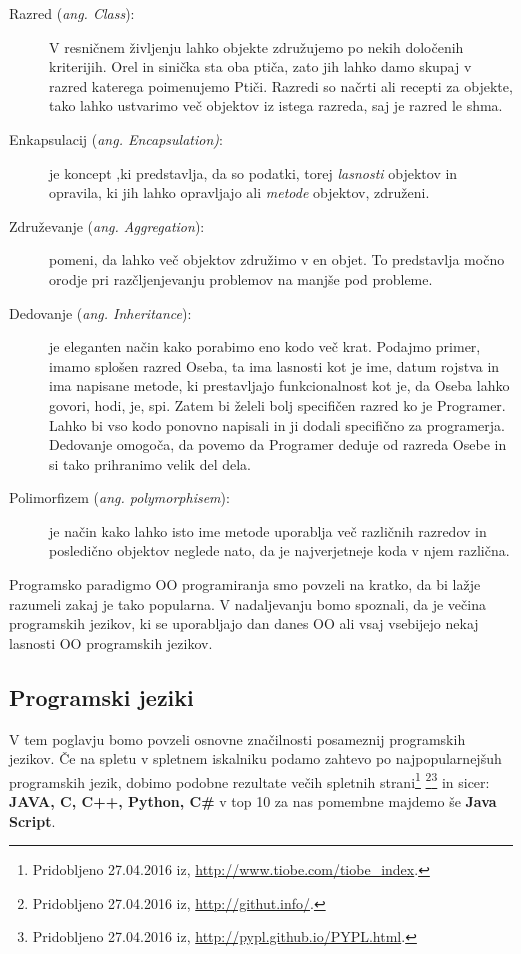 \begin{description}
\item[Razred (\emph{ang. Class}):] V resničnem življenju lahko objekte
  združujemo po nekih določenih kriterijih. Orel in sinička sta oba
  ptiča, zato jih lahko damo skupaj v razred katerega poimenujemo
  Ptiči. Razredi so načrti ali recepti za objekte, tako lahko
  ustvarimo več objektov iz istega razreda, saj je razred le shma.
\item [Enkapsulacij (\emph{ang. Encapsulation)}:] je koncept ,ki
  predstavlja, da so podatki, torej \emph{lasnosti} objektov in
  opravila, ki jih lahko opravljajo ali \emph{metode} objektov,
  združeni.
\item [Združevanje (\emph{ang. Aggregation}):] pomeni, da lahko več
  objektov združimo v en objet. To predstavlja močno orodje pri
  razčljenjevanju problemov na manjše pod probleme.
\item [Dedovanje (\emph{ang. Inheritance}):] je eleganten način kako
  porabimo eno kodo več krat. Podajmo primer, imamo splošen razred
  Oseba, ta ima lasnosti kot je ime, datum rojstva in ima napisane
  metode, ki prestavljajo funkcionalnost kot je, da Oseba lahko
  govori, hodi, je, spi. Zatem bi želeli bolj specifičen razred ko je
  Programer. Lahko bi vso kodo ponovno napisali in ji dodali
  specifično za programerja. Dedovanje omogoča, da povemo da Programer
  deduje od razreda Osebe in si tako prihranimo velik del dela.
\item [Polimorfizem (\emph{ang. polymorphisem}):] je način kako lahko
  isto ime metode uporablja več različnih razredov in posledično
  objektov neglede nato, da je najverjetneje koda v njem
  različna.
\end{description}

Programsko paradigmo OO programiranja smo povzeli na kratko, da bi
lažje razumeli zakaj je tako popularna. V nadaljevanju bomo spoznali,
da je večina programskih jezikov, ki se uporabljajo dan danes OO ali
vsaj vsebijejo nekaj lasnosti OO programskih jezikov.

\subsection{Programski jeziki}
\label{sec:programski_jeziki}

V tem poglavju bomo povzeli osnovne značilnosti posameznij programskih
jezikov.  Če na spletu v spletnem iskalniku podamo zahtevo
po najpopularnejšuh programskih jezik, dobimo podobne rezultate
večih spletnih strani\footnote{Pridobljeno 27.04.2016 iz,
  \url{http://www.tiobe.com/tiobe_index}.}  \footnote{Pridobljeno
  27.04.2016 iz, \url{http://githut.info/}.}\footnote{Pridobljeno
  27.04.2016 iz, \url{http://pypl.github.io/PYPL.html}.}  in sicer: \textbf{JAVA,
  C, C++, Python, C\#} v top 10 za nas pomembne majdemo še
\textbf{Java Script}. %

